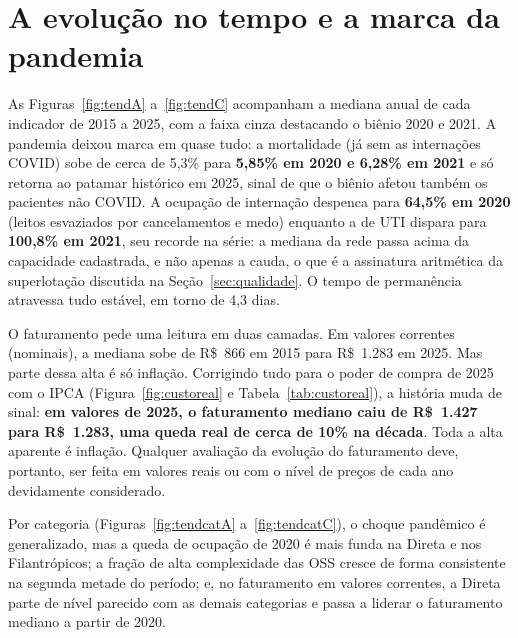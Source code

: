 \section{A evolução no tempo e a marca da pandemia}
\label{sec:tendencia}

As Figuras~\ref{fig:tendA} a~\ref{fig:tendC} acompanham a mediana anual
de cada indicador de 2015 a 2025, com a faixa cinza destacando o biênio
2020 e 2021. A pandemia deixou marca em quase tudo: a mortalidade (já sem as
internações COVID) sobe de cerca de 5,3\% para \textbf{5,85\% em 2020 e
6,28\% em 2021} e só retorna ao patamar histórico em 2025, sinal de que
o biênio afetou também os pacientes não COVID. A ocupação de internação
despenca para \textbf{64,5\% em 2020} (leitos esvaziados por
cancelamentos e medo) enquanto a de UTI dispara para \textbf{100,8\% em
2021}, seu recorde na série: a mediana da rede passa acima da
capacidade cadastrada, e não apenas a cauda, o que é a assinatura
aritmética da superlotação discutida na Seção~\ref{sec:qualidade}. O tempo de permanência atravessa tudo
estável, em torno de 4,3 dias.

O faturamento pede uma leitura em duas camadas. Em valores correntes
(nominais), a mediana sobe de R\$~866 em 2015 para R\$~1.283 em 2025.
Mas parte dessa alta é só inflação. Corrigindo tudo para o poder de
compra de 2025 com o IPCA (Figura~\ref{fig:custoreal} e
Tabela~\ref{tab:custoreal}), a história muda de sinal: \textbf{em
valores de 2025, o faturamento mediano caiu de R\$~1.427 para R\$~1.283, uma
queda real de cerca de 10\% na década}. Toda a alta aparente é
inflação. Qualquer avaliação da evolução do faturamento deve, portanto, ser
feita em valores reais ou com o nível de preços de cada ano devidamente
considerado.

Por categoria (Figuras~\ref{fig:tendcatA} a~\ref{fig:tendcatC}), o
choque pandêmico é
generalizado, mas a queda de ocupação de 2020 é mais funda na Direta e
nos Filantrópicos; a fração de alta complexidade das OSS cresce de
forma consistente na segunda metade do período; e, no faturamento em
valores correntes, a Direta
parte de nível parecido com as demais categorias e passa a liderar o
faturamento mediano a partir de 2020.

